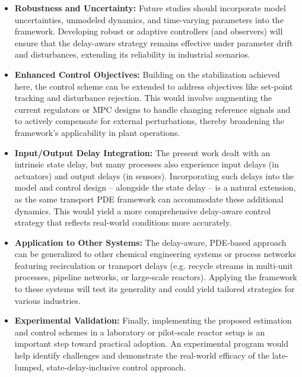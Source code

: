 		\begin{itemize}
			\item \textbf{Robustness and Uncertainty:} Future studies should incorporate model uncertainties, unmodeled dynamics, and time-varying parameters into the framework. Developing robust or adaptive controllers (and observers) will ensure that the delay-aware strategy remains effective under parameter drift and disturbances, extending its reliability in industrial scenarios.
			\item \textbf{Enhanced Control Objectives:} Building on the stabilization achieved here, the control scheme can be extended to address objectives like set-point tracking and disturbance rejection. This would involve augmenting the current regulators or MPC designs to handle changing reference signals and to actively compensate for external perturbations, thereby broadening the framework’s applicability in plant operations.
			\item \textbf{Input/Output Delay Integration:} The present work dealt with an intrinsic state delay, but many processes also experience input delays (in actuators) and output delays (in sensors). Incorporating such delays into the model and control design – alongside the state delay – is a natural extension, as the same transport PDE framework can accommodate these additional dynamics. This would yield a more comprehensive delay-aware control strategy that reflects real-world conditions more accurately.
			\item \textbf{Application to Other Systems:} The delay-aware, PDE-based approach can be generalized to other chemical engineering systems or process networks featuring recirculation or transport delays (e.g. recycle streams in multi-unit processes, pipeline networks, or large-scale reactors). Applying the framework to these systems will test its generality and could yield tailored strategies for various industries.
			\item \textbf{Experimental Validation:} Finally, implementing the proposed estimation and control schemes in a laboratory or pilot-scale reactor setup is an important step toward practical adoption. An experimental program would help identify challenges and demonstrate the real-world efficacy of the late-lumped, state-delay-inclusive control approach.
		\end{itemize}
